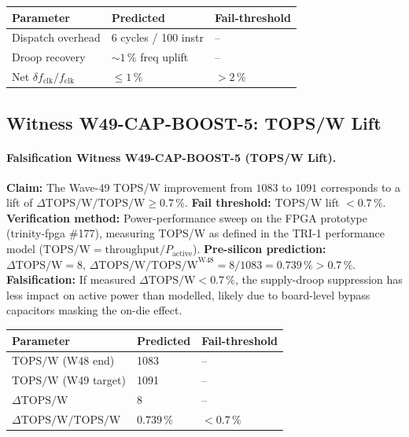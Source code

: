 \documentclass[12pt,a4paper]{report}
\theoremstyle{plain}
\theoremstyle{definition}
\theoremstyle{remark}
\newcommand{\fclk}{f_{\mathrm{clk}}}
\newcommand{\TOPSW}{\mathrm{TOPS/W}}
\begin{document}
\begin{center}
\begin{tabular}{lll}
  \toprule
  Parameter & Predicted & Fail-threshold \\
  \midrule
  Dispatch overhead & 6 cycles / 100 instr & -- \\
  Droop recovery & $\sim 1\,\%$ freq uplift & -- \\
  Net $\delta \fclk / \fclk$ & $\leq 1\,\%$ & $> 2\,\%$ \\
  \bottomrule
\end{tabular}
\end{center}

\subsection{Witness W49-CAP-BOOST-5: TOPS/W Lift}

\paragraph{Falsification Witness W49-CAP-BOOST-5 (TOPS/W Lift).}
\label{fw:5}
\textbf{Claim:} The Wave-49 TOPS/W improvement from $1083$ to $1091$
corresponds to a lift of $\Delta\TOPSW / \TOPSW \geq 0.7\,\%$.
\textbf{Fail threshold:} TOPS/W lift $< 0.7\,\%$.
\textbf{Verification method:} Power-performance sweep on the FPGA prototype
(trinity-fpga \#177), measuring TOPS/W as defined in the TRI-1
performance model ($\TOPSW = \mathrm{throughput} / P_{\mathrm{active}}$).
\textbf{Pre-silicon prediction:} $\Delta\TOPSW = 8$,
$\Delta\TOPSW / \TOPSW^{\mathrm{W48}} = 8/1083 = 0.739\,\% > 0.7\,\%$.
\textbf{Falsification:} If measured $\Delta\TOPSW < 0.7\,\%$,
the supply-droop suppression has less impact on active power than modelled,
likely due to board-level bypass capacitors masking the on-die effect.

\begin{center}
\begin{tabular}{lll}
  \toprule
  Parameter & Predicted & Fail-threshold \\
  \midrule
  $\TOPSW$ (W48 end) & 1083 & -- \\
  $\TOPSW$ (W49 target) & 1091 & -- \\
  $\Delta\TOPSW$ & 8 & -- \\
  $\Delta\TOPSW / \TOPSW$ & $0.739\,\%$ & $< 0.7\,\%$ \\
  \bottomrule
\end{tabular}
\end{center}
\end{document}
